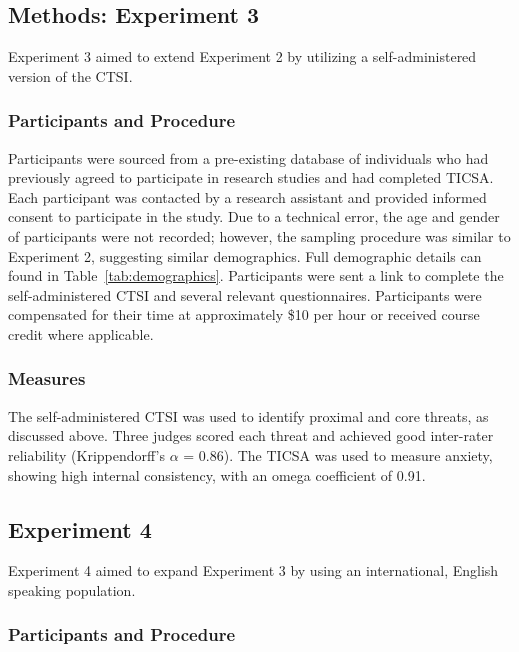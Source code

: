 \documentclass[
  man,floatsintext]{apa7}
\begin{document}
\subsection{Methods: Experiment 3}\label{methods-experiment-3}

Experiment 3 aimed to extend Experiment 2 by utilizing a self-administered version of the CTSI.

\subsubsection{Participants and Procedure}\label{participants-and-procedure}

Participants were sourced from a pre-existing database of individuals who had previously agreed to participate in research studies and had completed TICSA.
Each participant was contacted by a research assistant and provided informed consent to participate in the study.
Due to a technical error, the age and gender of participants were not recorded; however, the sampling procedure was similar to Experiment 2, suggesting similar demographics.
Full demographic details can found in Table~\ref{tab:demographics}.
Participants were sent a link to complete the self-administered CTSI and several relevant questionnaires.
Participants were compensated for their time at approximately \$10 per hour or received course credit where applicable.

\subsubsection{Measures}\label{measures-3}

The self-administered CTSI was used to identify proximal and core threats, as discussed above.
Three judges scored each threat and achieved good inter-rater reliability (Krippendorff's \(\alpha\) = 0.86).
The TICSA was used to measure anxiety, showing high internal consistency, with an omega coefficient of 0.91.

\subsection{Experiment 4}\label{experiment-4}

Experiment 4 aimed to expand Experiment 3 by using an international, English speaking population.

\subsubsection{Participants and Procedure}\label{participants-and-procedure-1}
\end{document}
